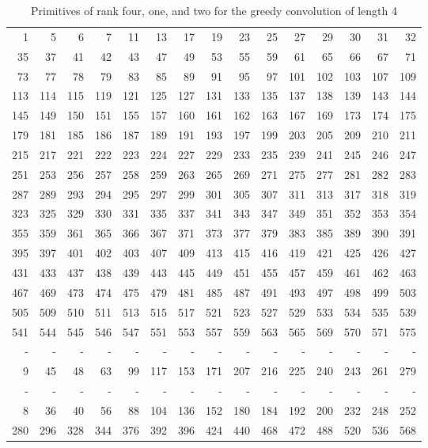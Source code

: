 \documentclass[12pt]{article}
\theoremstyle{definition}
\theoremstyle{remark}
\theoremstyle{plain}
\begin{document}
\begin{table}[ptbh]
\caption{\label{tab:orgc9a0059}Primitives of rank four, one, and two for the greedy convolution of length 4}
\centering
\begin{tabular}{rrrrrrrrrrrrrrr}
1 & 5 & 6 & 7 & 11 & 13 & 17 & 19 & 23 & 25 & 27 & 29 & 30 & 31 & 32\\
35 & 37 & 41 & 42 & 43 & 47 & 49 & 53 & 55 & 59 & 61 & 65 & 66 & 67 & 71\\
73 & 77 & 78 & 79 & 83 & 85 & 89 & 91 & 95 & 97 & 101 & 102 & 103 & 107 & 109\\
113 & 114 & 115 & 119 & 121 & 125 & 127 & 131 & 133 & 135 & 137 & 138 & 139 & 143 & 144\\
145 & 149 & 150 & 151 & 155 & 157 & 160 & 161 & 162 & 163 & 167 & 169 & 173 & 174 & 175\\
179 & 181 & 185 & 186 & 187 & 189 & 191 & 193 & 197 & 199 & 203 & 205 & 209 & 210 & 211\\
215 & 217 & 221 & 222 & 223 & 224 & 227 & 229 & 233 & 235 & 239 & 241 & 245 & 246 & 247\\
251 & 253 & 256 & 257 & 258 & 259 & 263 & 265 & 269 & 271 & 275 & 277 & 281 & 282 & 283\\
287 & 289 & 293 & 294 & 295 & 297 & 299 & 301 & 305 & 307 & 311 & 313 & 317 & 318 & 319\\
323 & 325 & 329 & 330 & 331 & 335 & 337 & 341 & 343 & 347 & 349 & 351 & 352 & 353 & 354\\
355 & 359 & 361 & 365 & 366 & 367 & 371 & 373 & 377 & 379 & 383 & 385 & 389 & 390 & 391\\
395 & 397 & 401 & 402 & 403 & 407 & 409 & 413 & 415 & 416 & 419 & 421 & 425 & 426 & 427\\
431 & 433 & 437 & 438 & 439 & 443 & 445 & 449 & 451 & 455 & 457 & 459 & 461 & 462 & 463\\
467 & 469 & 473 & 474 & 475 & 479 & 481 & 485 & 487 & 491 & 493 & 497 & 498 & 499 & 503\\
505 & 509 & 510 & 511 & 513 & 515 & 517 & 521 & 523 & 527 & 529 & 533 & 534 & 535 & 539\\
541 & 544 & 545 & 546 & 547 & 551 & 553 & 557 & 559 & 563 & 565 & 569 & 570 & 571 & 575\\
- & - & - & - & - & - & - & - & - & - & - & - & - & - & -\\
9 & 45 & 48 & 63 & 99 & 117 & 153 & 171 & 207 & 216 & 225 & 240 & 243 & 261 & 279\\
- & - & - & - & - & - & - & - & - & - & - & - & - & - & -\\
8 & 36 & 40 & 56 & 88 & 104 & 136 & 152 & 180 & 184 & 192 & 200 & 232 & 248 & 252\\
280 & 296 & 328 & 344 & 376 & 392 & 396 & 424 & 440 & 468 & 472 & 488 & 520 & 536 & 568\\
\end{tabular}
\end{table}
\end{document}
